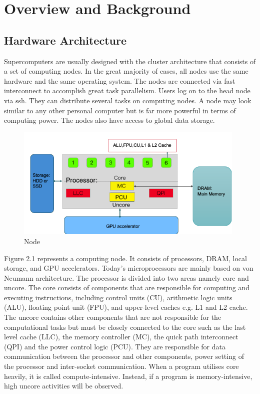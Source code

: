 \chapter{Overview and Background}

\section{Hardware Architecture}

Supercomputers are usually designed with the cluster architecture that consists of a set of computing nodes. In the great majority of cases, all nodes use the same hardware and the same operating system. The nodes are connected via fast interconnect to accomplish great task parallelism. Users log on to the head node via ssh. They can distribute several tasks on computing nodes. A node may look similar to any other personal computer but is far more powerful in terms of computing power.  The nodes also have access to global data storage.

\begin{figure}[htbp]
\centering
\includegraphics[width=11cm]{pictures/fig2.2}
\caption{Node}
\end{figure}

Figure 2.1 represents a computing node. It consists of processors, DRAM, local storage, and GPU accelerators. Today's microprocessors are mainly based on von Neumann architecture. The processor is divided into two areas namely core and uncore. The core consists of components that are responsible for computing and executing instructions, including control units (CU), arithmetic logic units (ALU), floating point unit (FPU),  and upper-level caches e.g. L1 and L2 cache.  The uncore contains other components that are not responsible for the computational tasks but must be closely connected to the core such as the last level cache (LLC), the memory controller (MC), the quick path interconnect (QPI) and the power control logic (PCU).  They are responsible for data communication between the processor and other components, power setting of the processor and inter-socket communication. When a program utilises core heavily, it is called compute-intensive. Instead, if a program is memory-intensive, high uncore activities will be observed. 

